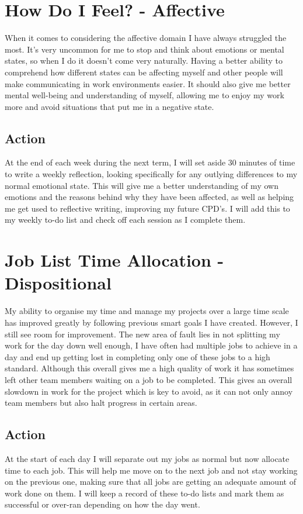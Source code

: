 \documentclass{scrartcl}
\begin{document}
\section{How Do I Feel? - Affective}
When it comes to considering the affective domain I have always struggled the most. It's very uncommon for me to stop and think about emotions or mental states, so when I do it doesn't come very naturally. Having a better ability to comprehend how different states can be affecting myself and other people will make communicating in work environments easier. It should also give me better mental well-being and understanding of myself, allowing me to enjoy my work more and avoid situations that put me in a negative state.
\subsection{Action}
At the end of each week during the next term, I will set aside 30 minutes of time to write a weekly reflection, looking specifically for any outlying differences to my normal emotional state. This will give me a better understanding of my own emotions and the reasons behind why they have been affected, as well as helping me get used to reflective writing, improving my future CPD's. I will add this to my weekly to-do list and check off each session as I complete them.

\section{Job List Time Allocation - Dispositional}
My ability to organise my time and manage my projects over a large time scale has improved greatly by following previous smart goals I have created. However, I still see room for improvement. The new area of fault lies in not splitting my work for the day down well enough, I have often had multiple jobs to achieve in a day and end up getting lost in completing only one of these jobs to a high standard. Although this overall gives me a high quality of work it has sometimes left other team members waiting on a job to be completed. This gives an overall slowdown in work for the project which is key to avoid, as it can not only annoy team members but also halt progress in certain areas.
\subsection{Action}
At the start of each day I will separate out my jobs as normal but now allocate time to each job. This will help me move on to the next job and not stay working on the previous one, making sure that all jobs are getting an adequate amount of work done on them. I will keep a record of these to-do lists and mark them as successful or over-ran depending on how the day went.
\end{document}
